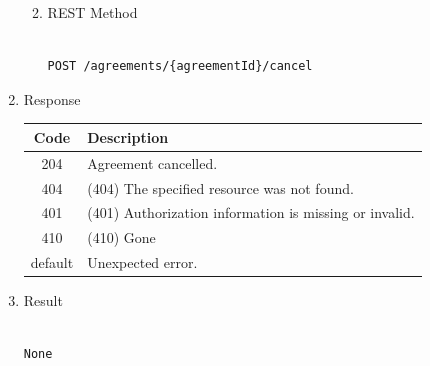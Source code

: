 \begin{enumerate}
\begin{enumerate}
\begin{table}[H]
\begin{center}
\begin{tabular}{|p{3cm}|l|p{3cm}|p{3cm}|p{4cm}|}
\end{tabular}
\end{center}

\end{table}

\item REST Method

\begin{tcolorbox}[boxrule=0pt, frame empty]
\begin{verbatim} 

POST /agreements/{agreementId}/cancel

\end{verbatim}
\end{tcolorbox}

\end{enumerate}

\item Response

\begin{table}[H]
\footnotesize

\begin{center}
\begin{tabular}{|c|l|} 
\hline
\rowcolor{lightgray}	Code 		& 	Description \\
\hline
204	 		&	Agreement cancelled. \\
\hline
404			&	(404) The specified resource was not found. \\
\hline
401			&	(401) Authorization information is missing or invalid. \\
\hline
410			&	(410) Gone \\
\hline
default		&	Unexpected error. \\
\hline
\end{tabular}
\end{center}

\end{table}

\item Result

\begin{tcolorbox}[boxrule=0pt, frame empty]
\begin{verbatim}

None

\end{verbatim}
\end{tcolorbox}



\end{enumerate}
